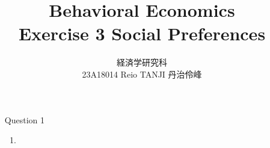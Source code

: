 \documentclass{jsarticle}
\begin{document}
\title{Behavioral Economics \\
Exercise 3 Social Preferences}
\author{経済学研究科　 \\ 23A18014 Reio TANJI 丹治伶峰}
\date{}
\maketitle

\begin{enumerate}

\item [Question 1]

\begin{enumerate}

\item


 
 
\end{enumerate}

\end{enumerate}
\end{document}
